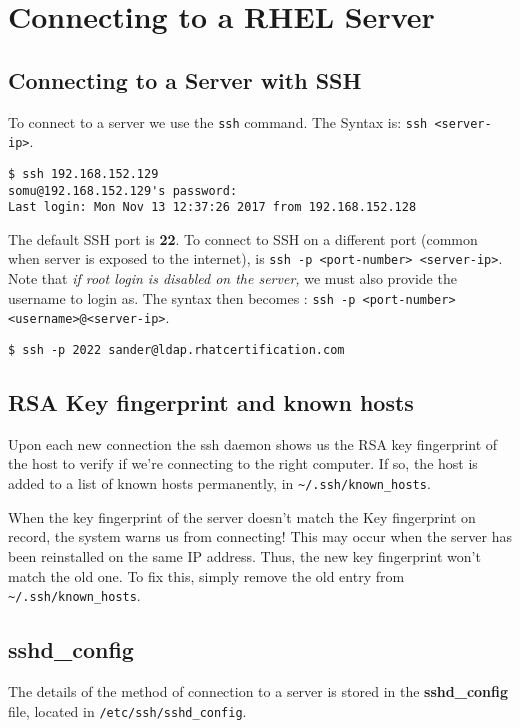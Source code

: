 \chapter{Connecting to a RHEL Server}
\section{Connecting to a Server with SSH}
To connect to a server we use the \verb|ssh| command. The Syntax is: \verb|ssh <server-ip>|.

\begin{verbatim}
$ ssh 192.168.152.129
somu@192.168.152.129's password: 
Last login: Mon Nov 13 12:37:26 2017 from 192.168.152.128
\end{verbatim}

The default SSH port is \textbf{22}. To connect to SSH on a different port (common when server is exposed to the internet), is \verb|ssh -p <port-number> <server-ip>|. Note that \textit{if root login is disabled on the server,} we must also provide the username to login as. The syntax then becomes : \verb|ssh -p <port-number> <username>@<server-ip>|.

\begin{verbatim} 
$ ssh -p 2022 sander@ldap.rhatcertification.com
\end{verbatim}

\section{RSA Key fingerprint and known hosts}
Upon each new connection the ssh daemon shows us the RSA key fingerprint of the host to verify if we're connecting to the right computer. If so, the host is added to a list of known hosts permanently, in \verb|~/.ssh/known_hosts|. 

When the key fingerprint of the server doesn't match the Key fingerprint on record, the system warns us from connecting! This may occur when the server has been reinstalled on the same IP address. Thus, the new key fingerprint won't match the old one. To fix this, simply remove the old entry from \verb|~/.ssh/known_hosts|.

\section{sshd\_config}
The details of the method of connection to a server is stored in the \textbf{sshd\_config} file, located in \verb|/etc/ssh/sshd_config|. 

